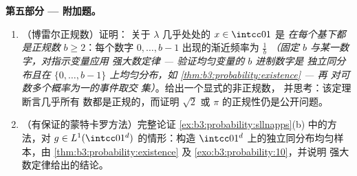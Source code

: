 \begin{problem}
\medskip
\noindent\textbf{第五部分 --- 附加题。}
\begin{enumerate}[resume]
  \item （博雷尔正规数）证明：
        关于 $\lambda$ 几乎处处的 $x \in \intcc01$ 是
        \emph{在每个基下都是正规数} $b \geq 2$：每个数字
        $0, \dots, b-1$ 出现的渐近频率为
        $\frac1b$ \emph{（固定 $b$ 与某一数字，对指示变量应用
        强大数定律 --- 验证均匀变量的
        $b$ 进制数字是
        独立同分布且在 $\{0,\dots,b-1\}$ 上均匀分布，如
        \cref{thm:b3:probability:existence} --- 再
        对可数多个概率为一的事件取交
        集）}。给出一个显式的非正规数，
        并思考：该定理断言几乎所有
        数都是正规的，而证明 $\sqrt2$ 或
        $\pi$ 的正规性仍是公开问题。
  \item （有保证的蒙特卡罗方法）完整论证
        \cref{ex:b3:probability:sllnapps}(b) 中的方法，对
        $g \in L^1(\intcc01^d)$ 的情形：构造
        $\intcc01^d$ 上的独立同分布均匀样本，由
        \cref{thm:b3:probability:existence} 及
        \cref{exo:b3:probability:10}，并说明
        强大数定律给出的结论。
\end{enumerate}


\end{problem}

